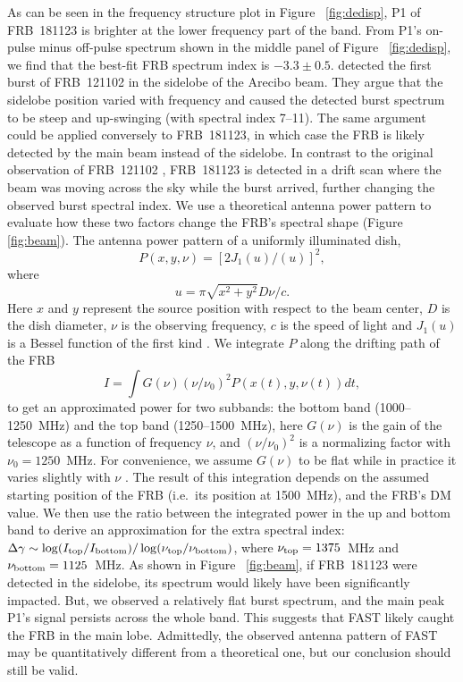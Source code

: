 As can be seen in the frequency structure plot in Figure ~\ref{fig:dedisp}, P1 of FRB~181123 is brighter at the lower frequency part of the band. From P1's on-pulse minus off-pulse spectrum shown in the middle panel of Figure ~\ref{fig:dedisp}, we find that the best-fit FRB spectrum index is $-3.3\pm0.5$. \citet{sch+14} detected the first burst of FRB~121102 in the sidelobe of the Arecibo beam. They argue that the sidelobe position varied with frequency and caused the detected burst spectrum to be steep and up-swinging (with spectral index 7--11). The same argument could be applied conversely to FRB~181123, in which case the FRB is likely detected by the main beam instead of the sidelobe. In contrast to the original observation of FRB~121102 \citep{sch+14}, FRB~181123 is detected in a drift scan where the beam was moving across the sky while the burst arrived, further changing the observed burst spectral index. 
We use a theoretical antenna power pattern to evaluate how these two factors change the FRB's spectral shape (Figure \ref{fig:beam}). 
The antenna power pattern of a uniformly illuminated dish,
\begin{equation}
    P(x,y,\nu)=[2J_1(u)/(u)]^2,
\end{equation} 
where 
\begin{equation}
u=\pi\sqrt{x^2+y^2} D \nu/c.
\end{equation} 
Here $x$ and $y$ represent the source position with respect to the beam center, $D$ is the dish diameter, $\nu$ is the observing frequency, $c$ is the speed of light and $J_1(u)$ is a Bessel function of the first kind \citep{ToRA}.
We integrate $P$ along the drifting path of the FRB 
\begin{equation}
I=\int G(\nu) (\nu/\nu_0)^2 P(x(t), y, \nu(t))dt, 
\end{equation}
to get an approximated power for two subbands: the bottom band (1000--1250~MHz) and the top band (1250--1500~MHz), here $G(\nu)$ is the gain of the telescope as a function of frequency $\nu$, and $(\nu/\nu_0)^2 $ is a normalizing factor with $\nu_0=1250$~MHz.
For convenience, we assume $G(\nu)$ to be flat while in practice it varies slightly with $\nu$ \citep{jth+20}.
The result of this integration depends on the assumed starting position of the FRB (i.e.~its position at 1500~MHz), and the FRB's DM value.
We then use the ratio between the integrated power in the up and bottom band to derive an approximation for the extra spectral index: $\Delta \gamma \sim \log(I_{\rm top}/I_{\rm bottom})/\log(\rm \nu_{\rm top}/\nu_{\rm bottom})$, where $\nu_{\rm top} = 1375$~MHz and $\nu_{\rm bottom}=1125$~MHz.
As shown in Figure ~\ref{fig:beam}, if FRB~181123 were detected in the sidelobe, its spectrum would likely have been significantly impacted. But, we observed a relatively flat burst spectrum, and the main peak P1's signal persists across the whole band. This suggests that FAST likely caught the FRB in the main lobe.
Admittedly, the observed antenna pattern of FAST \citep{jth+20} may be quantitatively different from a theoretical one, but our conclusion should still be valid.

